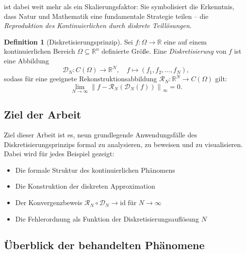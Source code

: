 ﻿\documentclass[a4paper,12pt]{article}
\theoremstyle{definition}
\newtheorem{definition}{Definition}
\begin{document}
ist dabei weit mehr als ein Skalierungsfaktor: Sie symbolisiert die Erkenntnis, dass Natur und Mathematik eine fundamentale Strategie teilen -- die \emph{Reproduktion des Kontinuierlichen durch diskrete Teillösungen}.

\begin{definition}[Diskretisierungsprinzip]
    Sei $f : \Omega \to \mathbb{R}$ eine auf einem kontinuierlichen Bereich $\Omega \subseteq \mathbb{R}^n$ definierte Größe. Eine \emph{Diskretisierung} von $f$ ist eine Abbildung
    \[
    \mathcal{D}_N : C(\Omega) \to \mathbb{R}^N,\quad f \mapsto (f_1, f_2, \ldots, f_N),
    \]
    sodass für eine geeignete Rekonstruktionsabbildung $\mathcal{R}_N : \mathbb{R}^N \to C(\Omega)$ gilt:
    \[
    \lim_{N \to \infty} \left\| f - \mathcal{R}_N(\mathcal{D}_N(f)) \right\|_\infty = 0.
    \]
\end{definition}

\subsection{Ziel der Arbeit}

Ziel dieser Arbeit ist es, neun grundlegende Anwendungsfälle des Diskretisierungsprinzips formal zu analysieren, zu beweisen und zu visualisieren. Dabei wird für jedes Beispiel gezeigt:
\begin{itemize}
    \item Die formale Struktur des kontinuierlichen Phänomens
    \item Die Konstruktion der diskreten Approximation
    \item Der Konvergenzbeweis $\mathcal{R}_N \circ \mathcal{D}_N \to \mathrm{id}$ für $N \to \infty$
    \item Die Fehlerordnung als Funktion der Diskretisierungsauflösung $N$
\end{itemize}

\subsection{Überblick der behandelten Phänomene}
\end{document}
